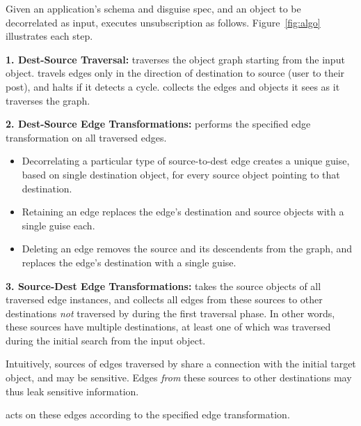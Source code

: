 Given an application's schema and disguise spec, and an object to be decorrelated as input,
\sys executes unsubscription as follows. Figure~\ref{fig:algo} illustrates each step.
    
    \vspace{0.5\baselineskip}\noindent\textbf{1. Dest-Source Traversal:} 
        \sys traverses the object graph starting from the input object. \sys travels edges only in
        the direction of destination to source (\eg user to their post), and halts if it detects a
        cycle.
        \sys collects the edges and objects it sees as it traverses the graph.

    \vspace{0.5\baselineskip}\noindent\textbf{2. Dest-Source Edge Transformations:}
        \sys performs the specified edge transformation on all traversed edges.
     
     \begin{itemize}
         \item Decorrelating a particular type of source-to-dest edge creates a unique guise, based
        on single destination object, for every source object pointing to that destination.

    \item Retaining an edge replaces the edge's destination and source objects with a single guise
        each.
        
    \item Deleting an edge removes the source and its descendents from the graph, and replaces the
        edge's destination with a single guise.
     \end{itemize}

    \vspace{0.5\baselineskip}\noindent\textbf{3. Source-Dest Edge Transformations:}
        \sys takes the source objects of all traversed edge instances, and collects all edges
        from these sources to other destinations \emph{not} traversed by \sys during the first
        traversal phase. In other words, these sources have multiple destinations, at least one of which
        was traversed during the initial search from the input object.

        Intuitively, sources of edges traversed by \sys share a connection with the initial
        target object, and may be sensitive. Edges \emph{from} these sources to other destinations may
        thus leak sensitive information.

        \sys acts on these edges according to the specified edge transformation.
     
